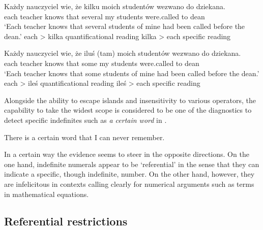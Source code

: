 \documentclass[output=paper,
]{langscibook}
\begin{document}
	\ea \gll Każdy nauczyciel wie, że kilku moich studentów wezwano do dziekana.\label{ex:indef-scope-kilka}\\
	each teacher knows that several my students were.called to dean\\
	\glt `Each teacher knows that several students of mine had been called before the dean.'
	\ea each > kilka \hfill quantificational reading\label{ex:indef-scope-kilka-quantificational}
	\ex kilka > each \hfill specific reading\label{ex:indef-scope-kilka-specific}
	\z
    \z

    \ea \gll Każdy nauczyciel wie, że {iluś (tam)} moich studentów wezwano do dziekana.\label{ex:indef-scope-iles}\\
	each teacher knows that some my students were.called to dean\\
	\glt `Each teacher knows that some students of mine had been called before the dean.'
	\ea each > ileś \hfill quantificational reading\label{ex:indef-scope-iles-quantificational}
	\ex ileś > each \hfill specific reading\label{ex:indef-scope-iles-specific}
	\z
    \z

	\noindent Alongside the ability to escape islands and insensitivity to various operators, the capability to take the widest scope is considered to be one of the diagnostics to detect specific indefinites such as \textit{a certain word} in .
	
	\ea There is a certain word that I can never remember.\label{ex:specific-indefinite}
    \z

\noindent In a certain way the evidence seems to steer in the opposite directions. On the one hand, indefinite numerals appear to be `referential' in the sense that they can indicate a specific, though indefinite, number. On the other hand, however, they are infelicitous in contexts calling clearly for numerical arguments such as terms in mathematical equations.

	\subsection{Referential restrictions}\label{sec:referential-restrictions}
	
\end{document}
